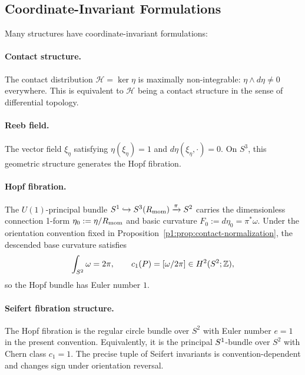 \documentclass[11pt]{article}
\begin{document}
\subsection{Coordinate-Invariant Formulations}
\label{p1:subsec:coordinate-invariant}

Many structures have coordinate-invariant formulations:

\paragraph{Contact structure.} The contact distribution $\mathcal{H} = \ker\eta$ is maximally non-integrable: $\eta \wedge d\eta \neq 0$ everywhere. This is equivalent to $\mathcal{H}$ being a contact structure in the sense of differential topology.

\paragraph{Reeb field.} The vector field $\xi_\eta$ satisfying $\eta(\xi_\eta)=1$ and $d\eta(\xi_\eta,\cdot)=0$. On $S^3$, this geometric structure generates the Hopf fibration.

\paragraph{Hopf fibration.} The $U(1)$-principal bundle $S^1\hookrightarrow S^3(R_{\mathrm{mom}})\xrightarrow{\pi} S^2$ carries the dimensionless connection 1-form $\eta_0:=\eta/R_{\mathrm{mom}}$ and basic curvature $F_0:=d\eta_0=\pi^*\omega$. Under the orientation convention fixed in Proposition~\ref{p1:prop:contact-normalization}, the descended base curvature satisfies
\[
\int_{S^2}\omega=2\pi,
\qquad
c_1(P)=[\omega/2\pi]\in H^2(S^2;\mathbb{Z}),
\]
so the Hopf bundle has Euler number \(1\).

\paragraph{Seifert fibration structure.} The Hopf fibration is the regular circle bundle over $S^2$ with Euler number $e=1$ in the present convention.  Equivalently, it is the principal $S^1$-bundle over $S^2$ with Chern class $c_1=1$.  The precise tuple of Seifert invariants is convention-dependent and changes sign under orientation reversal.
\end{document}
